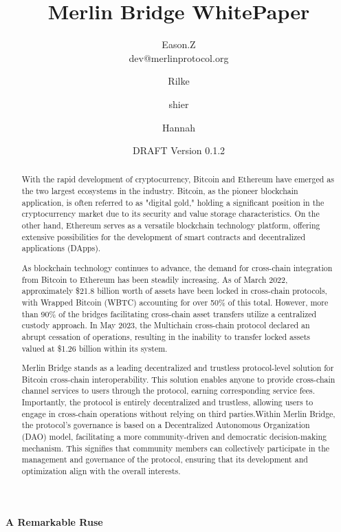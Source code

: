 \documentclass{article}
\title{Merlin Bridge WhitePaper}
\author{Eason.Z \\dev@merlinprotocol.org \and Rilke \and shier \and Hannah}
\date{DRAFT Version 0.1.2}
\begin{document}
\maketitle

\begin{center}
\Large\textbf{A Remarkable Ruse}
\end{center}

\begin{abstract}
With the rapid development of cryptocurrency, Bitcoin and Ethereum have emerged as the two largest ecosystems in the industry. Bitcoin, as the pioneer blockchain application, is often referred to as "digital gold," holding a significant position in the cryptocurrency market due to its security and value storage characteristics. On the other hand, Ethereum serves as a versatile blockchain technology platform, offering extensive possibilities for the development of smart contracts and decentralized applications (DApps).
\par As blockchain technology continues to advance, the demand for cross-chain integration from Bitcoin to Ethereum has been steadily increasing. As of March 2022, approximately \$21.8 billion worth of assets have been locked in cross-chain protocols, with Wrapped Bitcoin (WBTC) \cite{wbtc}accounting for over 50\% of this total. However, more than 90\% of the bridges facilitating cross-chain asset transfers utilize a centralized custody approach. In May 2023, the Multichain cross-chain protocol declared an abrupt cessation of operations, resulting in the inability to transfer locked assets valued at \$1.26 billion within its system.
\par Merlin Bridge stands as a leading decentralized and trustless protocol-level solution for Bitcoin cross-chain interoperability. This solution enables anyone to provide cross-chain channel services to users through the protocol, earning corresponding service fees. Importantly, the protocol is entirely decentralized and trustless, allowing users to engage in cross-chain operations without relying on third parties.Within Merlin Bridge, the protocol's governance is based on a Decentralized Autonomous Organization (DAO) model, facilitating a more community-driven and democratic decision-making mechanism. This signifies that community members can collectively participate in the management and governance of the protocol, ensuring that its development and optimization align with the overall interests.
\end{abstract}
\end{document}
